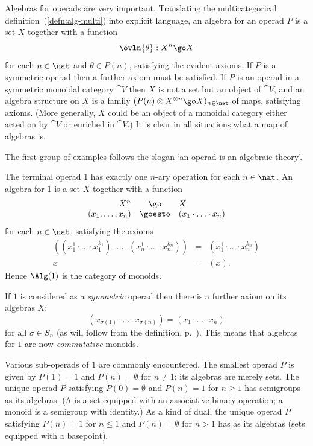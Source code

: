 Algebras%
%
%
for operads are very important.  Translating the multicategorical
definition~(\ref{defn:alg-multi}) into explicit language, an algebra for an
operad $P$ is a set $X$ together with a function
\[
\ovln{\theta}: X^n \go X
\]%
% 
%
% 
for each $n\in\nat$ and $\theta\in P(n)$, satisfying the evident axioms.
If $P$ is a symmetric operad then a further axiom must be satisfied.  If
$P$ is an operad in a symmetric monoidal category $\cat{V}$ then $X$ is not
a set but an object of $\cat{V}$, and an algebra structure on $X$ is a
family $(P(n) \otimes X^{\otimes n} \go X)_{n\in\nat}$ of maps, satisfying
axioms.  (More generally, $X$ could be an object of a monoidal category
either acted on by $\cat{V}$ or enriched in $\cat{V}$.)  It is clear in all
situations what a map of algebras is.

The first group of examples follows the slogan `an operad is an algebraic%
%
%
%
%
theory'. 

\begin{example}	
The terminal%
%
%
operad $1$ has exactly one $n$-ary operation for each
$n\in\nat$.  An algebra for $1$ is a set $X$ together with a function
\[
\begin{array}{rcl}
X^n	&\go	&X	\\
(x_1, \ldots, x_n)	&\goesto	&(x_1 \cdot\ldots\cdot x_n)
\end{array}
\]
for each $n\in\nat$, satisfying the axioms
%
\begin{eqnarray*}
((x_1^1 \cdot \ldots \cdot x_1^{k_1}) 
\cdot \ldots \cdot 
(x_n^1 \cdot \ldots \cdot x_n^{k_n}))	&
=	&
(x_1^1 \cdot \ldots \cdot x_n^{k_n})			\\
x	&=	&(x).			
\end{eqnarray*}
%
Hence $\Alg(1)$ is the category of monoids.%
%
%

If $1$ is considered as a \emph{symmetric} operad then there is a further
axiom on its algebras $X$:
\[
(x_{\sigma(1)} \cdot \ldots \cdot x_{\sigma(n)})	
=	
(x_1 \cdot \ldots \cdot x_n) 
\]
for all $\sigma\in S_n$ (as will follow from the definition,
p.~\pageref{p:defn-sym-alg}).  This means that algebras for $1$ are now
\emph{commutative} monoids.
\end{example}

\begin{example}
Various sub-operads of $1$ are commonly encountered.  The smallest operad
$P$ is given by $P(1) = 1$ and $P(n) = \emptyset$ for $n\neq 1$; its
algebras are merely sets.  The unique operad $P$ satisfying $P(0) =
\emptyset$ and $P(n) = 1$ for $n\geq 1$ has semigroups as its algebras.  (A
%
%
%
is a set equipped with an associative binary operation; a
monoid is a semigroup with identity.)  As a kind of dual, the unique operad
$P$ satisfying $P(n) = 1$ for $n\leq 1$ and $P(n) = \emptyset$ for $n > 1$
has as its algebras  (sets equipped with a basepoint).
\end{example}

